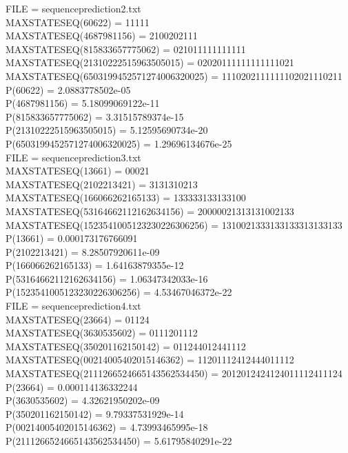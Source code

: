 \documentclass{article}
\begin{document}
\noindent FILE =  sequenceprediction2.txt \\
MAXSTATESEQ(60622) = 11111 \\
MAXSTATESEQ(4687981156) = 2100202111 \\
MAXSTATESEQ(815833657775062) = 021011111111111 \\
MAXSTATESEQ(21310222515963505015) = 02020111111111111021 \\
MAXSTATESEQ(6503199452571274006320025) = 1110202111111102021110211 \\
P(60622) = 2.0883778502e-05  \\
P(4687981156) = 5.18099069122e-11  \\
P(815833657775062) = 3.31515789374e-15  \\
P(21310222515963505015) = 5.12595690734e-20  \\
P(6503199452571274006320025) = 1.29696134676e-25  \\


\noindent FILE =  sequenceprediction3.txt \\
MAXSTATESEQ(13661) = 00021 \\
MAXSTATESEQ(2102213421) = 3131310213 \\
MAXSTATESEQ(166066262165133) = 133333133133100 \\
MAXSTATESEQ(53164662112162634156) = 20000021313131002133 \\
MAXSTATESEQ(1523541005123230226306256) = 1310021333133133313133133 \\
P(13661) = 0.000173176766091  \\
P(2102213421) = 8.28507920611e-09  \\
P(166066262165133) = 1.64163879355e-12  \\
P(53164662112162634156) = 1.06347342033e-16  \\
P(1523541005123230226306256) = 4.53467046372e-22  \\


\noindent FILE =  sequenceprediction4.txt \\
MAXSTATESEQ(23664) = 01124 \\
MAXSTATESEQ(3630535602) = 0111201112 \\
MAXSTATESEQ(350201162150142) = 011244012441112 \\
MAXSTATESEQ(00214005402015146362) = 11201112412444011112 \\
MAXSTATESEQ(2111266524665143562534450) = 2012012424124011112411124 \\
P(23664) = 0.000114136332244  \\
P(3630535602) = 4.32621950202e-09  \\
P(350201162150142) = 9.79337531929e-14  \\
P(00214005402015146362) = 4.73993465995e-18  \\
P(2111266524665143562534450) = 5.61795840291e-22  \\
\end{document}
